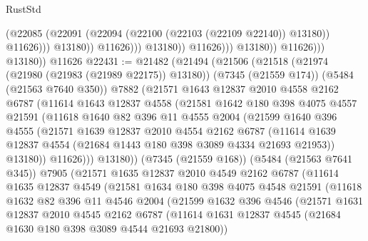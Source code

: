 \begin{lexlean}{RustStd}
\begin{coremodule}
{\begin{coremodule}
{{{{{{{{{{{{{{{{{{{{{{{{{{{{{{{                                        (@22085
                                          (@22091
                                            (@22094 (@22100 (@22103 (@22109 @22140)) @13180))
                                            @11626)))
                                      @13180))
                                  @11626)))
                            @13180))
                        @11626)))
                  @13180))
              @11626)))
        @13180))
    @11626
@22431 := @21482
    (@21494
      (@21506
        (@21518
          (@21974 (@21980 (@21983 (@21989 @22175)) @13180))
          (@7345 (@21559 @174))
          (@5484 (@21563 @7640 @350))
          @7882
          (@21571
            @1643
            @12837
            @2010
            @4558
            @2162
            @6787
            (@11614
              @1643
              @12837
              @4558
              (@21581
                @1642
                @180
                @398
                @4075
                @4557
                @21591
                (@11618
                  @1640
                  @82
                  @396
                  @11
                  @4555
                  @2004
                  (@21599
                    @1640
                    @396
                    @4555
                    (@21571
                      @1639
                      @12837
                      @2010
                      @4554
                      @2162
                      @6787
                      (@11614 @1639 @12837 @4554 (@21684 @1443 @180 @398 @3089 @4334 @21693 @21953))
                      @13180))
                  @11626)))
            @13180))
        (@7345 (@21559 @168))
        (@5484 (@21563 @7641 @345))
        @7905
        (@21571
          @1635
          @12837
          @2010
          @4549
          @2162
          @6787
          (@11614
            @1635
            @12837
            @4549
            (@21581
              @1634
              @180
              @398
              @4075
              @4548
              @21591
              (@11618
                @1632
                @82
                @396
                @11
                @4546
                @2004
                (@21599
                  @1632
                  @396
                  @4546
                  (@21571
                    @1631
                    @12837
                    @2010
                    @4545
                    @2162
                    @6787
                    (@11614 @1631 @12837 @4545 (@21684 @1630 @180 @398 @3089 @4544 @21693 @21800))
}}}}}}}}}}}}}}}}}}}}}}}}}}}}}}}
\end{coremodule}}
\end{coremodule}
\end{lexlean}
